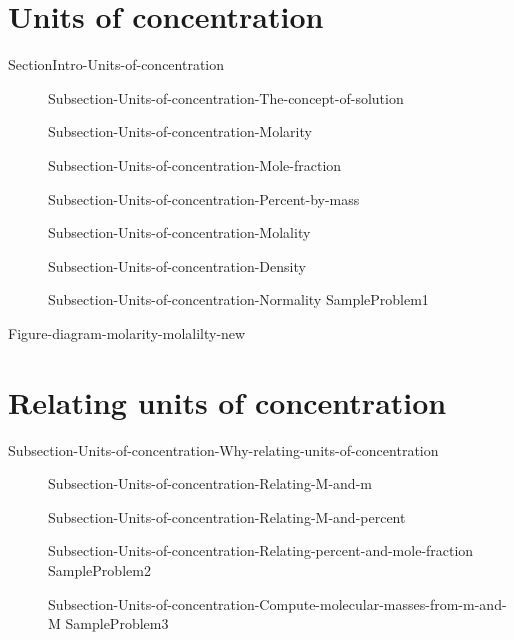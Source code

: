 \documentclass[main.tex]{subfiles}
\newcommand\chapterlabel{Ch-solutions}\setcounter{figurenewcounter}{0}\setcounter{tablenewcounter}{0}\setcounter{formulanewcounter}{0}\chapterpicture{../{\chapterlabel}/figure1}\chapterpicturelabel{PxFuel}
\begin{document}
\section{Units of concentration}{SectionIntro-Units-of-concentration}
\sloppy \begin{description}
\item[] 
{Subsection-Units-of-concentration-The-concept-of-solution}
\item[] {Subsection-Units-of-concentration-Molarity}
\item[] {Subsection-Units-of-concentration-Mole-fraction}
\item[] {Subsection-Units-of-concentration-Percent-by-mass}
\item[] {Subsection-Units-of-concentration-Molality}
\item[] {Subsection-Units-of-concentration-Density}
\item[] {Subsection-Units-of-concentration-Normality}
{SampleProblem1}
\end{description}

{Figure-diagram-molarity-molalilty-new}
\section{Relating units of concentration}{Subsection-Units-of-concentration-Why-relating-units-of-concentration}
\sloppy \begin{description}
 \item[] {Subsection-Units-of-concentration-Relating-M-and-m}
\item[] {Subsection-Units-of-concentration-Relating-M-and-percent}
\item[] 
{Subsection-Units-of-concentration-Relating-percent-and-mole-fraction}
{SampleProblem2}
\item[] 
{Subsection-Units-of-concentration-Compute-molecular-masses-from-m-and-M}
{SampleProblem3}
\end{description}
\end{document}
